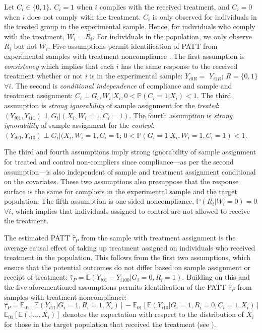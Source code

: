 Let \(C_{i}\in\{0,1\}\). \(C_{i}=1\) when \(i\) complies with the received
treatment, and \(C_{i}=0\) when \(i\) does not comply with the treatment.
\(C_{i}\) is only observed for individuals in the treated group in the
experimental sample. Hence, for individuals who comply with the
treatment, \(W_{i}=R_{i}\). For individuals in the population, we only
observe \(R_{i}\) but not \(W_{i}\). Five assumptions permit identification
of PATT from experimental samples with treatment noncompliance
\citep[ 110]{ottoboni2020PATT}. The first assumption is \emph{consistency} which
implies that each \(i\) has the same response to the received treatment
whether or not \(i\) is in the experimental sample: \(Y_{i0R}=\) \(Y_{i1R}\);
\(R=\{0,1\}\) \(\forall i.\) The second is \emph{conditional independence} of
compliance and sample and treatment assignment:
\(C_{i}\perp G_{i},W_{i}|X_{i}, 0<\mathbb{P}(C_{i}=1|X_{i})<1\). The third
assumption is \emph{strong ignorability} of sample assignment for the
\emph{treated}: \((Y_{i01},Y_{i11})\perp G_{i}|(X_{i},W_{i}=1,C_{i}=1)\). The
fourth assumption is \emph{strong ignorability} of sample assignment for the
\emph{control}: \((Y_{i00},Y_{i10})\perp G_{i}|(X_{i},W_{i}=1,C_{i}=1\);
\(0<\mathbb{P}(G_{i}=1|X_{i},W_{i}=1,C_{i}=1)<1\).

The third and fourth assumptions imply strong ignorability of sample
assignment for treated and control non-compliers since compliance---as
per the second assumption---is also independent of sample and treatment
assignment conditional on the covariates. These two assumptions also
presuppose that the response surface is the same for compliers in the
experimental sample and the target population. The fifth assumption is
one-sided noncompliance, \(\mathbb{P}(R_{i}|W_{i}=0)=0\) \(\forall i\),
which implies that individuals assigned to control are not allowed to
receive the treatment.

The estimated PATT \(\widehat{\tau}_{P}\) from the sample with treatment
assignment is the average causal effect of taking up treatment assigned
on individuals who received treatment in the population. This follows
from the first two assumptions, which ensure that the potential outcomes
do not differ based on sample assignment or receipt of treatment:
\(\widehat{\tau}_{P}=\mathbb{E}\left(Y_{i01}-Y_{i100}|G_{i}=0, R_{i}=1\right)\).
Building on this and the five aforementioned assumptions permits
identification of the PATT \(\widehat{\tau}_{P}\) from samples with
treatment noncompliance:
\[\widehat{\tau}_{P}=\mathbb{E}_{01}\left[\mathbb{E}(Y_{i11}|G_{i}=1,R_{i}=1,X_{i})\right]-\mathbb{E}_{01}\left[\mathbb{E}\left(Y_{i10}|G_{i}=1,R_{i}=0,C_{i}=1,X_{i}\right)\right]\]
\(\mathbb{E}_{01}\left[\mathbb{E}\left(.|...,X_{i}\right)\right]\) denotes
the expectation with respect to the distribution of \(X_{i}\) for those in
the target population that received the treatment (see
\citep[ 111]{ottoboni2020PATT}).

